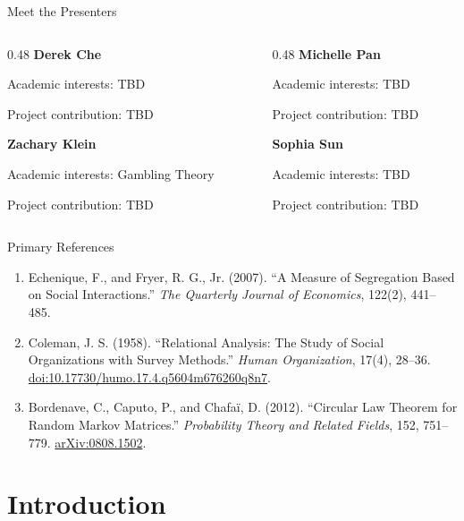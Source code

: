 \documentclass[aspectratio=169,10pt]{beamer}
\begin{document}
\begin{frame}[shrink=0]{Meet the Presenters}
\begin{columns}[T,onlytextwidth]
\begin{column}{0.48\textwidth}
\textbf{Derek Che}

Academic interests: TBD

Project contribution: TBD

\vspace{0.5cm}
\textbf{Zachary Klein}

Academic interests: Gambling Theory

Project contribution: TBD
\end{column}
\begin{column}{0.48\textwidth}
\textbf{Michelle Pan}

Academic interests: TBD

Project contribution: TBD

\vspace{0.5cm}
\textbf{Sophia Sun}

Academic interests: TBD

Project contribution: TBD
\end{column}
\end{columns}
\end{frame}

\begin{frame}[shrink=0]{Primary References}
\small
\begin{enumerate}
    \item Echenique, F., and Fryer, R. G., Jr. (2007).
    ``A Measure of Segregation Based on Social Interactions.''
    \textit{The Quarterly Journal of Economics}, 122(2), 441--485.
    \item Coleman, J. S. (1958).
    ``Relational Analysis: The Study of Social Organizations with Survey Methods.''
    \textit{Human Organization}, 17(4), 28--36.
    \href{https://doi.org/10.17730/humo.17.4.q5604m676260q8n7}{doi:10.17730/humo.17.4.q5604m676260q8n7}.
    \item Bordenave, C., Caputo, P., and Chafa\"i, D. (2012).
    ``Circular Law Theorem for Random Markov Matrices.''
    \textit{Probability Theory and Related Fields}, 152, 751--779.
    \href{https://arxiv.org/abs/0808.1502}{arXiv:0808.1502}.
\end{enumerate}
\end{frame}

\section{Introduction}
\end{document}
